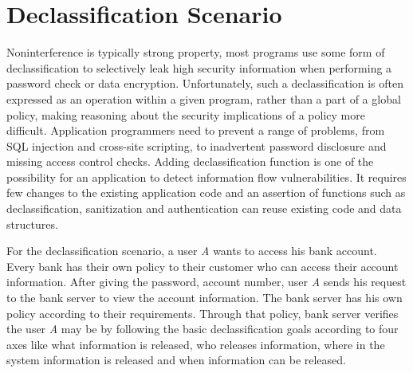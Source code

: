 \section{Declassification Scenario}
 Noninterference is typically
 strong property, most programs use some form of declassification to selectively leak high security information when performing a password check or data encryption. Unfortunately, such  a declassification is often expressed as an operation within a given  program, rather than a part of a global policy, making reasoning about the security implications of a policy more difficult. Application programmers need to prevent a range of problems, from SQL injection and cross-site scripting, to inadvertent password disclosure and missing access control checks. Adding declassification function is one of the possibility for an application to detect information flow vulnerabilities. It requires few changes to the existing application code and an assertion of functions such as declassification, sanitization and authentication can reuse existing code and data structures. 
 
 For the declassification scenario, a user \emph{A} wants to access his bank account. Every bank has their own policy to their customer who can access their account information. After giving the password, account number, user \emph{A} sends his request to the bank server to view the account information. The bank server has his own policy according to their requirements. Through that policy, bank server verifies the user \emph{A} may be by following the basic declassification goals according to four axes like what information is released,
 who releases information, where in the system information is released and when information can be released. 
 
